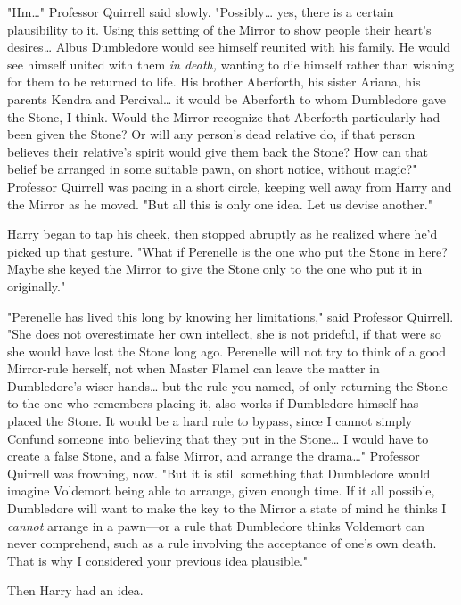 "Hm{\ldots}" Professor Quirrell said slowly. "Possibly{\ldots} yes, there is a 
certain plausibility to it. Using this setting of the Mirror to show people 
their heart's desires{\ldots} Albus Dumbledore would see himself reunited with 
his family. He would see himself united with them \emph{in death,} wanting to 
die himself rather than wishing for them to be returned to life. His brother 
Aberforth, his sister Ariana, his parents Kendra and Percival{\ldots} it would 
be Aberforth to whom Dumbledore gave the Stone, I think. Would the Mirror 
recognize that Aberforth particularly had been given the Stone? Or will any 
person's dead relative do, if that person believes their relative's spirit 
would give them back the Stone? How can that belief be arranged in some 
suitable pawn, on short notice, without magic?" Professor Quirrell was pacing 
in a short circle, keeping well away from Harry and the Mirror as he moved. 
"But all this is only one idea. Let us devise another."

Harry began to tap his cheek, then stopped abruptly as he realized where he'd 
picked up that gesture. "What if Perenelle is the one who put the Stone in 
here? Maybe she keyed the Mirror to give the Stone only to the one who put it 
in originally."

"Perenelle has lived this long by knowing her limitations," said Professor 
Quirrell. "She does not overestimate her own intellect, she is not prideful, if 
that were so she would have lost the Stone long ago. Perenelle will not try to 
think of a good Mirror-rule herself, not when Master Flamel can leave the 
matter in Dumbledore's wiser hands{\ldots} but the rule you named, of only 
returning the Stone to the one who remembers placing it, also works if 
Dumbledore himself has placed the Stone. It would be a hard rule to bypass, 
since I cannot simply Confund someone into believing that they put in the 
Stone{\ldots} I would have to create a false Stone, and a false Mirror, and 
arrange the drama{\ldots}" Professor Quirrell was frowning, now. "But it is 
still something that Dumbledore would imagine Voldemort being able to arrange, 
given enough time. If it all possible, Dumbledore will want to make the key to 
the Mirror a state of mind he thinks I \emph{cannot} arrange in a pawn---or a 
rule that Dumbledore thinks Voldemort can never comprehend, such as a rule 
involving the acceptance of one's own death. That is why I considered your 
previous idea plausible."

Then Harry had an idea.

